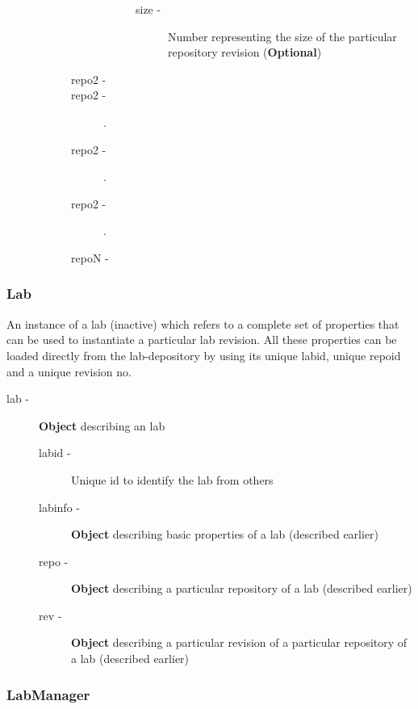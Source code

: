 \documentclass[11pt]{article}
\begin{document}
\begin{description}
\begin{description}
\begin{description}
\begin{description}
\begin{description}
\item [size -] Number representing the size of the particular repository revision (\textbf{Optional})
\end{description}

\end{description}

\item [repo2 -]
\item [repo2 -].
\item [repo2 -].
\item [repo2 -].
\item [repoN -]
\end{description}

\end{description}

\end{description}
\subsubsection{Lab}
\label{sec-3.2.2}


    An instance of a lab (inactive)  which refers to a complete set of
    properties that can be used to instantiate a particular lab
    revision. All these properties can be loaded directly from the
    lab-depository by using its unique labid, unique repoid and a
    unique revision no.

\begin{description}
\item [lab -]  \textbf{Object} describing an lab

\begin{description}
\item [labid -] Unique id to identify the lab from others
\item [labinfo -] \textbf{Object} describing basic properties of a lab (described earlier)
\item [repo -] \textbf{Object} describing a particular repository of a lab (described earlier)
\item [rev -] \textbf{Object} describing a particular revision of a particular
             repository of a lab (described earlier)
\end{description}

\end{description}
\subsubsection{LabManager}
\label{sec-3.2.3}
\end{document}
